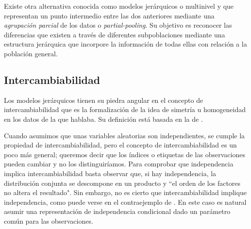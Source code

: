 Existe otra alternativa conocida como modelos jerárquicos o multinivel y que representan un punto intermedio entre las dos anteriores mediante una \textit{agrupación parcial} de los datos o \textit{partial-pooling}. Su objetivo es reconocer las diferencias que existen a través de diferentes subpoblaciones mediante una estructura jerárquica que incorpore la información de todas ellas con relación a la población general.

\subsection{Intercambiabilidad}

Los modelos jerárquicos tienen su piedra angular en el concepto de intercambiabilidad que es la formalización de la idea de simetría u homogeneidad en los datos de la que hablaba. Su definición está basada en la de \textcite{BernardoSmith00}.\\ 


Cuando asumimos que unas variables aleatorias son independientes, se cumple la propiedad de intercambiabilidad, pero el concepto de intercambiabilidad es un poco más general; queremos decir que los índices o etiquetas de las observaciones pueden cambiar y no los distinguiríamos. Para comprobar que independencia implica intercambiabilidad basta observar que, si hay independencia, la distribución conjunta se descompone en un producto y ``el orden de los factores no altera el resultado". Sin embargo, no es cierto que intercambiabilidad implique independencia, como puede verse en el contraejemplo de \textcite{GP98}. En este caso es natural asumir una representación de independencia condicional dado un parámetro común para las observaciones.\\ 

